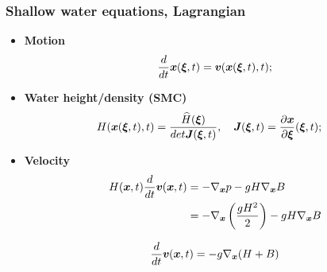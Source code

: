 \documentclass[pt12]{beamer}
\newcommand{\uvec}[2][3]{\boldsymbol{#2\mkern-#1mu}\mkern#1mu}
\begin{document}
\begin{frame}
\frametitle{Shallow water equations, Lagrangian}

\begin{itemize}

\item \textbf{Motion}
$$\frac{d}{dt}\uvec{x}(\uvec{\xi},t)=\uvec{v}(\uvec{x}(\uvec{\xi},t),t);$$

\item \textbf{Water height/density (SMC)} 
\begin{align*}
&H(\uvec{x}(\uvec{\xi},t),t)=\frac{\widehat{H}(\uvec{\xi})}{det \uvec{J}(\uvec{\xi},t)}, \quad \uvec{J}(\uvec{\xi},t)=\frac{\partial \uvec{x}}{\partial \uvec{\xi}}(\uvec{\xi},t);
\end{align*}


\item \textbf{Velocity} 
\begin{align*}
H(\uvec{x},t)\frac{d}{dt}\uvec{v}(\uvec{x},t)&=-\nabla_{\uvec{x}} p  -g H \nabla_{\uvec{x}}B\\
&=-\nabla_{\uvec{x}}\left(\frac{gH^2}{2}\right) -gH\nabla_{\uvec{x}}B
\end{align*}

$$\frac{d}{dt}\uvec{v}(\uvec{x},t)=-g\nabla_{\uvec{x}}(H+B)$$

\end{itemize}


\end{frame}
\end{document}
